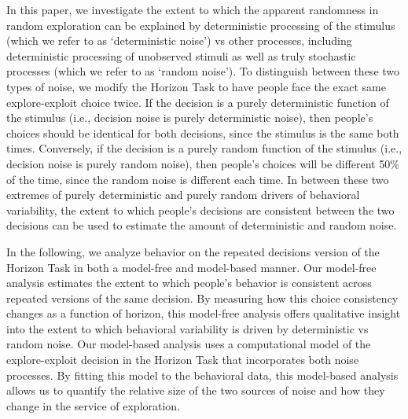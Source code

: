 \documentclass[12pt]{article}
\begin{document}
{	In this paper, we investigate the extent to which the apparent randomness in random exploration can be explained by deterministic processing of the stimulus (which we refer to as `deterministic noise') vs other processes, including deterministic processing of unobserved stimuli as well as truly stochastic processes (which we refer to as `random noise'). To distinguish between these two types of noise, we modify the Horizon Task \citep{wilson2014} to have people face the exact same explore-exploit choice twice. If the decision is a purely deterministic function of the stimulus (i.e., decision noise is purely deterministic noise), then people's choices should be identical for both decisions, since the stimulus is the same both times. Conversely, if the decision is a purely random function of the stimulus (i.e., decision noise is purely random noise), then people's choices will be different 50$\%$ of the time, since the random noise is different each time. In between these two extremes of purely deterministic and purely random drivers of behavioral variability, the extent to which people's decisions are consistent between the two decisions can be used to estimate the amount of deterministic and random noise. 
	
	
	In the following, we analyze behavior on the repeated decisions version of the Horizon Task in both a model-free and model-based manner. Our model-free analysis estimates the extent to which people's behavior is consistent across repeated versions of the same decision. By measuring how this choice consistency changes as a function of horizon, this model-free analysis offers qualitative insight into the extent to which behavioral variability is driven by deterministic vs random noise. Our model-based analysis uses a computational model of the explore-exploit decision in the Horizon Task that incorporates both noise processes. By fitting this model to the behavioral data, this model-based analysis allows us to quantify the relative size of the two sources of noise and how they change in the service of exploration.
	
	
}
\end{document}

